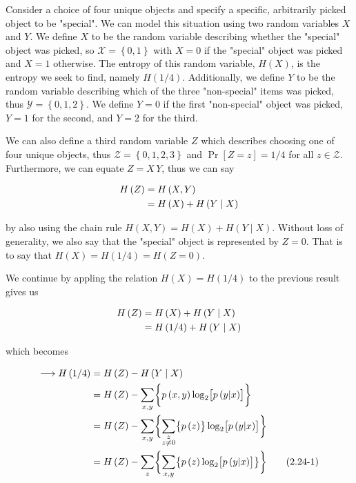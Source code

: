 \documentclass[ClusteringConnectionsMAIN.tex]{subfiles}
\begin{document}
	
  Consider a choice of four unique objects and specify a specific, arbitrarily picked object to be "special".  We can model this situation using two random variables $X$ and $Y$.  We define $X$ to be the random variable describing whether the "special" object was picked, so $\mathcal{X} = \left\{ 0, 1 \right\}$ with $X = 0$ if the "special" object was picked and $X = 1$ otherwise.  The entropy of this random variable, $H \left( X \right)$, is the entropy we seek to find, namely $H \left( 1 / 4 \right)$.  Additionally, we define $Y$ to be the random variable describing which of the three "non-special" items was picked, thus $\mathcal{Y} = \left\{ 0, 1, 2 \right\}$.  We define $Y = 0$ if the first "non-special" object was picked, $Y = 1$ for the second, and $Y = 2$ for the third. \newline

We can also define a third random variable $Z$ which describes choosing one of four unique objects, thus $\mathcal{Z} = \left\{ 0, 1, 2, 3\right\}$ and $\Pr \left[ Z = z \right] = 1 / 4$ for all $z \in \mathcal{Z}$.  Furthermore, we can equate $Z = X \, Y$, thus we can say

\begin{align} 
	H \left( Z \right) &= H \left( X, Y \right) \notag \\
	&= H \left( X \right) + H \left( Y \mid X \right) \notag
\end{align}

by also using the chain rule $H \left( X, Y \right) = H \left( X \right) + H \left( Y \mid X \right)$.  Without loss of generality, we also say that the "special" object is represented by $Z = 0$.  That is to say that  $H \left( X \right) = H \left( 1 / 4 \right) = H \left( Z = 0 \right)$.  \newline


We continue by appling the relation $H \left( X \right) = H \left( 1 / 4 \right)$ to the previous result gives us

\begin{align}
H \left( Z \right) &= H \left( X \right) + H \left( Y \mid X \right) \notag \\
&= H \left( 1/4 \right) + H \left( Y \mid X \right) \notag
\end{align}

which becomes

\begin{align} \label{c2p24eq1}
\longrightarrow H \left( 1/4 \right) &= H \left( Z \right) - H \left( Y \mid X \right) \notag \\
&= H \left( Z \right) - \sum_{x, y} \biggl\{ p \left( x, y \right) \log_2 \bigl[ p \left( y | x \right) \bigr] \biggr\}  \notag \\
&= H \left( Z \right) - \sum_{x, y} \biggl\{ \sum_{\substack{z \\ z \neq 0}} \bigl\{ p \left( z \right) \bigr\} \log_2 \bigl[ p \left( y | x \right) \bigr] \biggr\}  \notag \\
&= H \left( Z \right) - \sum_z \biggl\{ \sum_{x, y} \bigl\{ p \left( z \right) \log_2 \bigl[ p \left( y | x \right) \bigr] \bigr\} \biggr\}   \tag{2.24-1}
\end{align}
\end{document}
